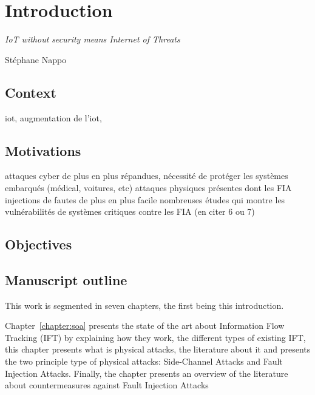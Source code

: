 \chapter{Introduction}
\label{chapter:introduction}

\epigraph{\textit{IoT without security means Internet of Threats}}{Stéphane Nappo}

\minitoc

\section{Context}
iot, augmentation de l'iot, 
\section{Motivations}
attaques cyber de plus en plus répandues, nécessité de protéger les systèmes embarqués (médical, voitures, etc)
attaques physiques présentes dont les FIA
injections de fautes de plus en plus facile \cite{rayvlite_wired, rayvlite_fraktal}
nombreuses études qui montre les vulnérabilités de systèmes critiques contre les FIA (en citer 6 ou 7)


\section{Objectives}

\section{Manuscript outline}

This work is segmented in seven chapters, the first being this introduction.

Chapter~\ref{chapter:soa} presents the state of the art about Information Flow Tracking (IFT) by explaining how they work, the different types of existing IFT, this chapter presents what is physical attacks, the literature about it and presents the two principle type of physical attacks: Side-Channel Attacks and Fault Injection Attacks. Finally, the chapter presents an overview of the literature about countermeasures against Fault Injection Attacks

